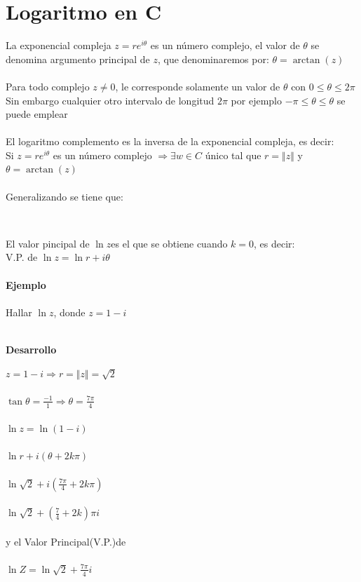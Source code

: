 \documentclass[10pt,a4paper]{book}
\begin{document}
\section{Logaritmo en C} 
La exponencial compleja $z=re^{i\theta}$ es un número complejo, el valor de $\theta$ se denomina argumento principal de $z$, que denominaremos por: $\theta=\arctan(z)$\\\\
Para todo complejo $z\neq0$, le corresponde solamente un valor de $\theta$ con $0\leq\theta\leq2\pi$\\
Sin embargo cualquier otro intervalo de longitud $2\pi$ por ejemplo $-\pi\leq\theta\leq\theta$ se puede emplear\\\\
El logaritmo complemento es la inversa de la exponencial compleja, es decir:\\
Si $z=re^{i\theta}$ es un número complejo $\Rightarrow \exists w \in C$ único tal que $r=\Vert z \Vert$ y $\theta=\arctan(z)$\\\\
Generalizando se tiene que:
\begin{center}
\\
\end{center}
El valor pincipal de $\ln z$es el que se obtiene cuando $k=0$, es decir:\\
V.P. de $\ln z=\ln r+i\theta$\\\\
{\bf Ejemplo}\\\\
Hallar $\ln z$, donde $z=1-i$\\\\
\begin{center}
\bf Desarrollo
\end{center}
$z=1-i \Rightarrow r=\Vert z \Vert=\sqrt{2}$\\\\
$\tan\theta=\frac{-1}{1} \Rightarrow \theta=\frac{7\pi}{4}$\\\\
$\ln z=\ln(1-i)$\\\\
$\ln r+i(\theta+2k\pi)$\\\\
$\ln \sqrt{2}+i(\frac{7\pi}{4}+2k\pi)$\\\\
$\ln \sqrt{2}+(\frac{7}{4}+2k)\pi i$\\\\
y el Valor Principal(V.P.)de\\\\
$\ln Z=\ln\sqrt{2}+\frac{7\pi}{4}i$
\end{document}
